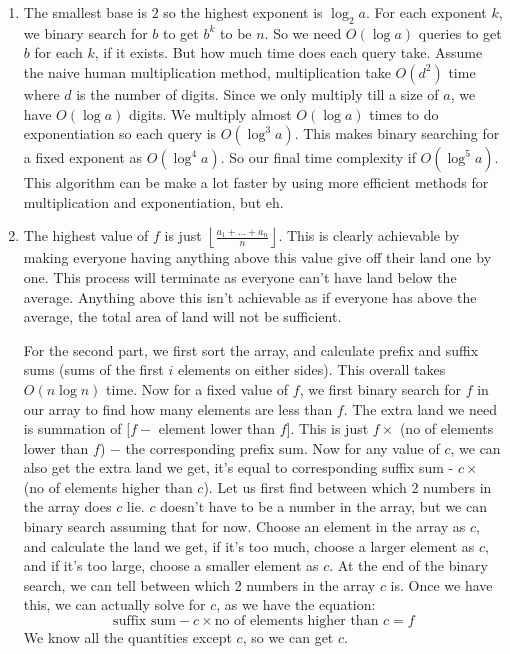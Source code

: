 \documentclass[12pt]{report}
\begin{document}
\begin{enumerate}[label=\textbf{\arabic*.}]
  \item The smallest base is $2$ so the highest exponent is $\log_2 a$. For each exponent $k$, we binary search for $b$
  to get $b^k$ to be $n$. So we need $O(\log a)$ queries to get $b$ for each $k$, if it exists. But how much time
  does each query take. Assume the naive human multiplication method, multiplication take $O(d^2)$ time where $d$
  is the number of digits. Since we only multiply till a size of $a$, we have $O(\log a)$ digits. We multiply
  almost $O(\log a)$ times to do exponentiation so each query is $O(\log^3 a)$. This makes binary searching for a 
  fixed exponent as $O(\log^4 a)$. So our final time complexity if $O(\log^5 a)$. This algorithm can be make a lot 
  faster by using more efficient methods for multiplication and exponentiation, but eh.

  \item The highest value of $f$ is just $\left \lfloor \frac{a_1 + \dots + a_n}{n} \right \rfloor$. This is clearly
  achievable by making everyone having anything above this value give off their land one by one. This process will 
  terminate as everyone can't have land below the average. Anything above this isn't achievable as if everyone has 
  above the average, the total area of land will not be sufficient.

  For the second part, we first sort the array, and calculate prefix and suffix sums (sums of the first $i$ elements
  on either sides). This overall takes $O(n \log n)$ time. Now for a fixed value of $f$, we first binary search for 
  $f$ in our array to find how many elements are less than $f$. The extra land we need is summation of [$f - $ 
  element lower than $f$]. This is just $f \times$ (no of elements lower than $f$) $-$ the corresponding prefix sum.
  Now for any value of $c$, we can also get the extra land we get, it's equal to corresponding suffix sum - $c \times$ 
  (no of elements higher than $c$). Let us first find between 
  which 2 numbers in the array does $c$ lie. $c$ doesn't have to be a number in the array, but we can binary search 
  assuming that for now. Choose an element in the array as $c$, and calculate the land we get, if it's too much, 
  choose a larger element as $c$, and if it's too large, choose a smaller element as $c$. At the end of the binary 
  search, we can tell between which 2 numbers in the array $c$ is. Once we have this, we can actually solve for $c$, 
  as we have the equation: 
  \[ \text{suffix sum} - c \times \text{no of elements higher than $c$} = f \]
  We know all the quantities except $c$, so we can get $c$. 


\end{enumerate}
\end{document}
